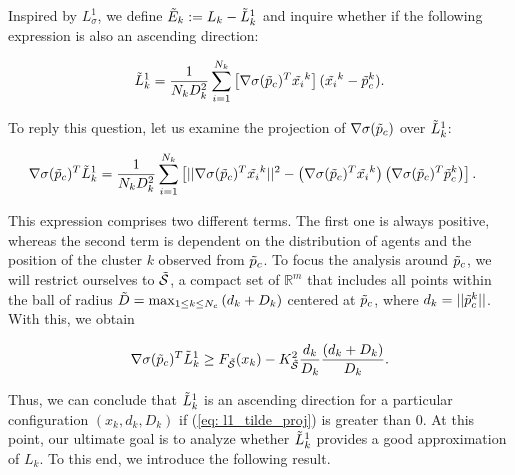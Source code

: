 Inspired by $L_\sigma^1$, we define $\Tilde{E}_k := L_k - \Tilde{L}^1_k$ and inquire whether if the following expression is also an ascending direction:

\begin{equation}\label{eq: l1_tilde}
   \Tilde{L}_k^1 = \frac{1}{N_k D_k^2}\sum^{N_k}_{i=1} \left[ \nabla\sigma(\Tilde p_c)^T\Tilde{x_i}^k \right]
                                                       (\Tilde{x_i}^k - \Tilde p_c^k).
\end{equation}

To reply this question, let us examine the projection of $\nabla\sigma(\Tilde p_c)$ over $\Tilde{L}_k^1$:

\begin{align*}
\nabla\sigma(\Tilde p_c)^T \Tilde{L}_k^1 & = \frac{1}{N_k D_k^2} \sum^{N_k}_{i=1} 
    \left[ 
    ||\nabla\sigma(\Tilde p_c)^T\Tilde{x_i}^k||^2 
    - \left(\nabla\sigma(\Tilde p_c)^T\Tilde{x_i}^k\right) \left(\nabla\sigma(\Tilde p_c)^T\Tilde p_c^k\right) 
    \right].
\end{align*}

This expression comprises two different terms. The first one is always positive, whereas the second term is dependent on the distribution of agents and the position of the cluster $k$ observed from $\Tilde p_c$. To focus the analysis around $\Tilde p_c$, we will restrict ourselves to $\Tilde{\mathcal{S}}$, a compact set of $\mathbb{R}^m$ that includes all points within the ball of radius $\Tilde{D} = \operatorname{max}_{1\leq k\leq N_c}{(d_k + D_k)}$ centered at $\Tilde p_c$, where $d_k = ||\Tilde p_c^k||$. With this, we obtain

\begin{equation}\label{eq: l1_tilde_proj}
   \nabla\sigma(\Tilde p_c)^T \Tilde{L}_k^1 \geq 
        F_{\Tilde{\mathcal{S}}} (x_k) - K_{\Tilde{\mathcal{S}}}^2 \frac{d_k}{D_k} \frac{(d_k + D_k)}{D_k}.
\end{equation}

Thus, we can conclude that $\Tilde{L}_k^1$ is an ascending direction for a particular configuration $(x_k, d_k, D_k)$ if (\ref{eq: l1_tilde_proj}) is greater than 0. At this point, our ultimate goal is to analyze whether $\Tilde{L}_k^1$ provides a good approximation of $L_k$. To this end, we introduce the following result.

